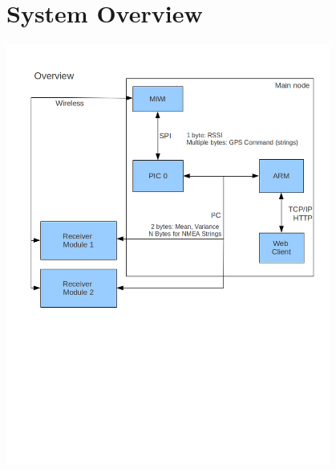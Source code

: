 \documentclass{article}
\begin{document}
\section*{System Overview}
\includegraphics[width=0.8\textwidth]{blockdiagram_overview}
\end{document}

